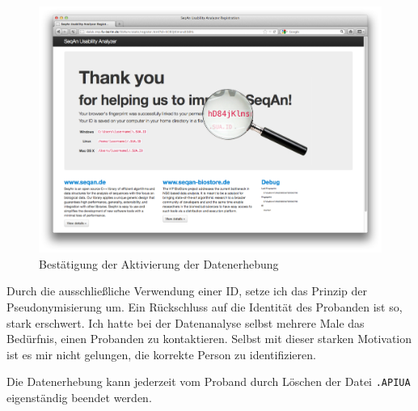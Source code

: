 \begin{figure}
  \centering
    \includegraphics[width=0.75\linewidth]{Figures/apiua/activation.png}
  \caption{Bestätigung der Aktivierung der Datenerhebung}
  \label{fig:apiua-activation}
\end{figure}

Durch die ausschließliche Verwendung einer ID, setze ich das Prinzip der Pseudonymisierung um. Ein Rückschluss auf die Identität des Probanden ist so, stark erschwert. Ich hatte bei der Datenanalyse selbst mehrere Male das Bedürfnis, einen Probanden zu kontaktieren. Selbst mit dieser starken Motivation ist es mir nicht gelungen, die korrekte Person zu identifizieren.

Die Datenerhebung kann jederzeit vom Proband durch Löschen der Datei \texttt{.APIUA} eigenständig beendet werden.

